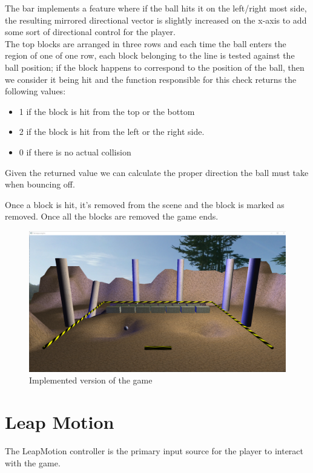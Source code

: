 \documentclass[a4paper]{report}
\begin{document}
The bar implements a feature where if the ball hits it on the left/right most side, the resulting mirrored directional vector is slightly increased on the x-axis to add some sort of directional control for the player.\\
The top blocks are arranged in three rows and each time the ball enters the region of one of one row, each block belonging to the line is tested against the ball position; if the block happens to correspond to the position of the ball, then we consider it being hit and the function responsible for this check returns the following values:
\begin{itemize}
\item 1 if the block is hit from the top or the bottom
\item 2 if the block is hit from the left or the right side.
\item 0 if there is no actual collision
\end{itemize} 

Given the returned value we can calculate the proper direction the ball must take when bouncing off.

Once a block is hit, it's removed from the scene and the block is marked as removed. Once all the blocks are removed the game ends.\\
\begin{figure}[H]
\centering
\includegraphics[scale=0.25]{Arkanoid3D}
\caption{Implemented version of the game}
\end{figure}

\section{Leap Motion}
The LeapMotion controller is the primary input source for the player to interact with the game. 
\end{document}
